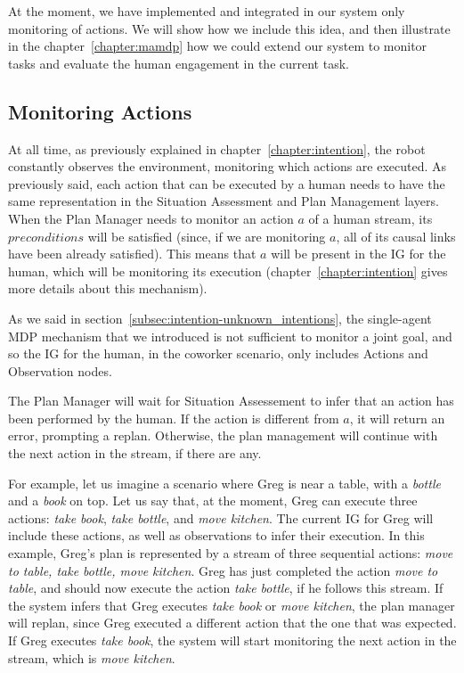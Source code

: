 At the moment, we have implemented and integrated in our system only monitoring of actions. We will show how we include this idea, and then illustrate in the chapter~\ref{chapter:mamdp} how we could extend our system to monitor tasks and evaluate the human engagement in the current task.

\subsection{Monitoring Actions}
At all time, as previously explained in chapter~\ref{chapter:intention}, the robot constantly observes the environment, monitoring which actions are executed. As previously said, each action that can be executed by a human needs to have the same representation in the Situation Assessment and Plan Management layers. When the Plan Manager needs to monitor an action $a$ of a human stream, its $preconditions$ will be satisfied (since, if we are monitoring $a$, all of its causal links have been already satisfied). This means that $a$ will be present in the IG for the human, which will be monitoring its execution (chapter~\ref{chapter:intention} gives more details about this mechanism).

As we said in section~\ref{subsec:intention-unknown_intentions}, the single-agent MDP mechanism that we introduced is not sufficient to monitor a joint goal, and so the IG for the human, in the coworker scenario, only includes Actions and Observation nodes.

The Plan Manager will wait for Situation Assessement to infer that an action has been performed by the human. If the action is different from $a$, it will return an error, prompting a replan. Otherwise, the plan management will continue with the next action in the stream, if there are any.

For example, let us imagine a scenario where Greg is near a table, with a \textit{bottle} and a \textit{book} on top. Let us say that, at the moment, Greg can execute three actions: \textit{take book}, \textit{take bottle}, and \textit{move kitchen}. The current IG for Greg will include these actions, as well as observations to infer their execution. In this example, Greg's plan is represented by a stream of three sequential actions: \textit{move to table, take bottle, move kitchen}. 
Greg has just completed the action \textit{move to table}, and should now execute the action \textit{take bottle}, if he follows this stream. If the system infers that Greg executes \textit{take book} or \textit{move kitchen}, the plan manager will replan, since Greg executed a different action that the one that was expected. If Greg executes \textit{take book}, the system will start monitoring the next action in the stream, which is \textit{move kitchen}.


